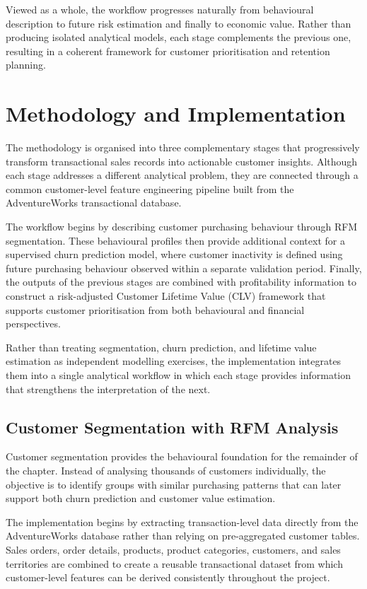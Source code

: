 \documentclass[
  12pt,
  letterpaper,
]{book}
\begin{document}
Viewed as a whole, the workflow progresses naturally from behavioural
description to future risk estimation and finally to economic value.
Rather than producing isolated analytical models, each stage complements
the previous one, resulting in a coherent framework for customer
prioritisation and retention planning.

\section{Methodology and
Implementation}\label{methodology-and-implementation-4}

The methodology is organised into three complementary stages that
progressively transform transactional sales records into actionable
customer insights. Although each stage addresses a different analytical
problem, they are connected through a common customer-level feature
engineering pipeline built from the AdventureWorks transactional
database.

The workflow begins by describing customer purchasing behaviour through
RFM segmentation. These behavioural profiles then provide additional
context for a supervised churn prediction model, where customer
inactivity is defined using future purchasing behaviour observed within
a separate validation period. Finally, the outputs of the previous
stages are combined with profitability information to construct a
risk-adjusted Customer Lifetime Value (CLV) framework that supports
customer prioritisation from both behavioural and financial
perspectives.

Rather than treating segmentation, churn prediction, and lifetime value
estimation as independent modelling exercises, the implementation
integrates them into a single analytical workflow in which each stage
provides information that strengthens the interpretation of the next.

\subsection{Customer Segmentation with RFM
Analysis}\label{customer-segmentation-with-rfm-analysis}

Customer segmentation provides the behavioural foundation for the
remainder of the chapter. Instead of analysing thousands of customers
individually, the objective is to identify groups with similar
purchasing patterns that can later support both churn prediction and
customer value estimation.

The implementation begins by extracting transaction-level data directly
from the AdventureWorks database rather than relying on pre-aggregated
customer tables. Sales orders, order details, products, product
categories, customers, and sales territories are combined to create a
reusable transactional dataset from which customer-level features can be
derived consistently throughout the project.
\end{document}
